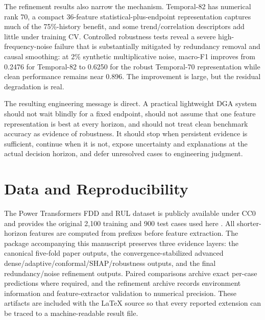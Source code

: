 \documentclass[conference]{IEEEtran}
\begin{document}
The refinement results also narrow the mechanism. Temporal-82 has numerical rank 70, a compact 36-feature statistical-plus-endpoint representation captures much of the 75\%-history benefit, and some trend/correlation descriptors add little under training CV. Controlled robustness tests reveal a severe high-frequency-noise failure that is substantially mitigated by redundancy removal and causal smoothing: at 2\% synthetic multiplicative noise, macro-F1 improves from 0.2476 for Temporal-82 to 0.6250 for the robust Temporal-70 representation while clean performance remains near 0.896. The improvement is large, but the residual degradation is real.

The resulting engineering message is direct. A practical lightweight DGA system should not wait blindly for a fixed endpoint, should not assume that one feature representation is best at every horizon, and should not treat clean benchmark accuracy as evidence of robustness. It should stop when persistent evidence is sufficient, continue when it is not, expose uncertainty and explanations at the actual decision horizon, and defer unresolved cases to engineering judgment.

\section*{Data and Reproducibility}
The Power Transformers FDD and RUL dataset is publicly available under CC0 and provides the original 2,100 training and 900 test cases used here \cite{katserDataset}. All shorter-horizon features are computed from prefixes before feature extraction. The package accompanying this manuscript preserves three evidence layers: the canonical five-fold paper outputs, the convergence-stabilized advanced dense/adaptive/conformal/SHAP/robustness outputs, and the final redundancy/noise refinement outputs. Paired comparisons archive exact per-case predictions where required, and the refinement archive records environment information and feature-extractor validation to numerical precision. These artifacts are included with the LaTeX source so that every reported extension can be traced to a machine-readable result file.

\balance


\end{document}
